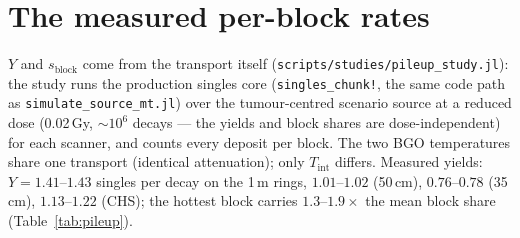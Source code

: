 \documentclass[11pt,a4paper]{article}
\begin{document}
\section{The measured per-block rates}
\label{sec:rates}

\begin{sloppypar}
$Y$ and $s_{\mathrm{block}}$ come from the transport itself
(\texttt{scripts/studies/pileup\_study.jl}): the study runs the production singles core
(\texttt{singles\_chunk!}, the same code path as \texttt{simulate\_source\_mt.jl}) over the
tumour-centred scenario source at a reduced dose (0.02\,Gy, $\sim$$10^6$ decays --- the yields and
block shares are dose-independent) for each scanner, and counts every deposit per block. The two
BGO temperatures share one transport (identical attenuation); only $T_{\mathrm{int}}$ differs.
Measured yields: $Y = 1.41$--$1.43$ singles per decay on the 1\,m rings, $1.01$--$1.02$ (50\,cm),
$0.76$--$0.78$ (35\,cm), $1.13$--$1.22$ (CHS); the hottest block carries $1.3$--$1.9\times$ the
mean block share (Table~\ref{tab:pileup}).
\end{sloppypar}
\end{document}
